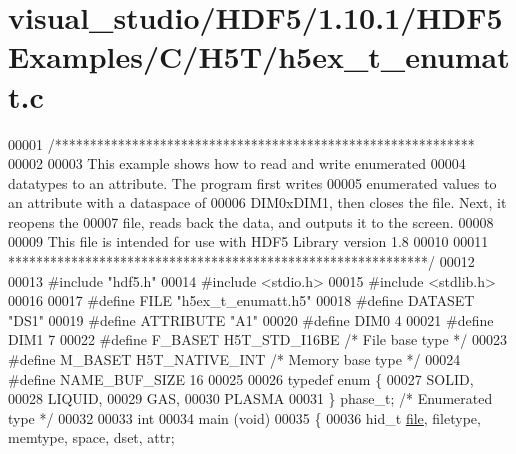 \hypertarget{visual__studio_2_h_d_f5_21_810_81_2_h_d_f5_examples_2_c_2_h5_t_2h5ex__t__enumatt_8c_source}{}\section{visual\+\_\+studio/\+H\+D\+F5/1.10.1/\+H\+D\+F5\+Examples/\+C/\+H5\+T/h5ex\+\_\+t\+\_\+enumatt.c}
\label{visual__studio_2_h_d_f5_21_810_81_2_h_d_f5_examples_2_c_2_h5_t_2h5ex__t__enumatt_8c_source}

\begin{DoxyCode}
00001 \textcolor{comment}{/************************************************************}
00002 \textcolor{comment}{}
00003 \textcolor{comment}{  This example shows how to read and write enumerated}
00004 \textcolor{comment}{  datatypes to an attribute.  The program first writes}
00005 \textcolor{comment}{  enumerated values to an attribute with a dataspace of}
00006 \textcolor{comment}{  DIM0xDIM1, then closes the file.  Next, it reopens the}
00007 \textcolor{comment}{  file, reads back the data, and outputs it to the screen.}
00008 \textcolor{comment}{}
00009 \textcolor{comment}{  This file is intended for use with HDF5 Library version 1.8}
00010 \textcolor{comment}{}
00011 \textcolor{comment}{ ************************************************************/}
00012 
00013 \textcolor{preprocessor}{#include "hdf5.h"}
00014 \textcolor{preprocessor}{#include <stdio.h>}
00015 \textcolor{preprocessor}{#include <stdlib.h>}
00016 
00017 \textcolor{preprocessor}{#define FILE            "h5ex\_t\_enumatt.h5"}
00018 \textcolor{preprocessor}{#define DATASET         "DS1"}
00019 \textcolor{preprocessor}{#define ATTRIBUTE       "A1"}
00020 \textcolor{preprocessor}{#define DIM0            4}
00021 \textcolor{preprocessor}{#define DIM1            7}
00022 \textcolor{preprocessor}{#define F\_BASET         H5T\_STD\_I16BE       }\textcolor{comment}{/* File base type */}\textcolor{preprocessor}{}
00023 \textcolor{preprocessor}{#define M\_BASET         H5T\_NATIVE\_INT      }\textcolor{comment}{/* Memory base type */}\textcolor{preprocessor}{}
00024 \textcolor{preprocessor}{#define NAME\_BUF\_SIZE   16}
00025 
00026 \textcolor{keyword}{typedef} \textcolor{keyword}{enum} \{
00027     SOLID,
00028     LIQUID,
00029     GAS,
00030     PLASMA
00031 \} phase\_t;                                  \textcolor{comment}{/* Enumerated type */}
00032 
00033 \textcolor{keywordtype}{int}
00034 main (\textcolor{keywordtype}{void})
00035 \{
00036     hid\_t       \hyperlink{structfile}{file}, filetype, memtype, space, dset, attr;

\end{DoxyCode}
